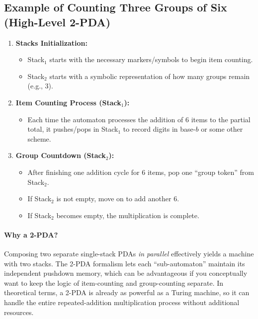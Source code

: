 \documentclass[11pt]{article}
\begin{document}
\subsection*{Example of Counting Three Groups of Six (High-Level 2-PDA)}

\begin{enumerate}
    \item \textbf{Stacks Initialization:} 
    \begin{itemize}
        \item Stack$_1$ starts with the necessary markers/symbols to begin item counting.
        \item Stack$_2$ starts with a symbolic representation of how many groups remain (e.g., 3).
    \end{itemize}
    \item \textbf{Item Counting Process (Stack$_1$):} 
    \begin{itemize}
        \item Each time the automaton processes the addition of 6 items to the partial total, it pushes/pops in Stack$_1$ to record digits in base-\(b\) or some other scheme.
    \end{itemize}
    \item \textbf{Group Countdown (Stack$_2$):}
    \begin{itemize}
        \item After finishing one addition cycle for 6 items, pop one “group token” from Stack$_2$. 
        \item If Stack$_2$ is not empty, move on to add another 6.
        \item If Stack$_2$ becomes empty, the multiplication is complete.
    \end{itemize}
\end{enumerate}

\paragraph{Why a 2-PDA?}
Composing two separate single-stack PDAs \textit{in parallel} effectively yields a machine with two stacks. The 2-PDA formalism lets each “sub-automaton” maintain its independent pushdown memory, which can be advantageous if you conceptually want to keep the logic of item-counting and group-counting separate. In theoretical terms, a 2-PDA is already as powerful as a Turing machine, so it can handle the entire repeated-addition multiplication process without additional resources.
\end{document}
